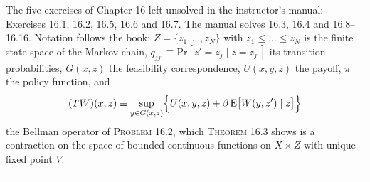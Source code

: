 \documentclass[11pt,letterpaper,reqno]{amsart}
\newcommand{\E}{\mathrm{E}}                  %
\newcommand{\Prob}{\mathrm{Pr}}
\newcommand{\bk}[1]{\textup{\textsc{#1}}}
\begin{document}
\begin{center}
\begin{minipage}{0.86\textwidth}
\small
The five exercises of Chapter 16 left unsolved in the instructor's manual: Exercises 16.1, 16.2,
16.5, 16.6 and 16.7.  The manual solves 16.3, 16.4 and 16.8--16.16.  Notation follows the book:
$Z=\{z_1,\dots,z_N\}$ with $z_1\le\dots\le z_N$ is the finite state space of the Markov chain,
$q_{jj'}\equiv\Prob[z'=z_j\mid z=z_{j'}]$ its transition probabilities, $G(x,z)$ the feasibility
correspondence, $U(x,y,z)$ the payoff, $\pi$ the policy function, and
\[
(TW)(x,z)\equiv\sup_{y\in G(x,z)}\Bigl\{U(x,y,z)+\beta\,\E\bigl[W(y,z')\mid z\bigr]\Bigr\}
\]
the Bellman operator of \bk{Problem 16.2}, which \bk{Theorem 16.3} shows is a contraction on the
space of bounded continuous functions on $X\times Z$ with unique fixed point $V$.
\end{minipage}
\end{center}

\bigskip
\hrule
\bigskip
\end{document}
